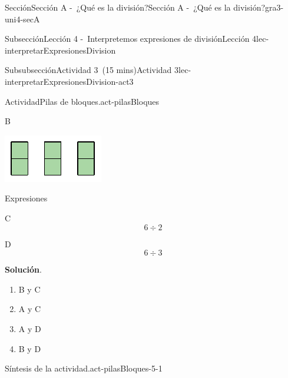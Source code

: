 \documentclass[oneside,10pt,]{article}
\newcommand{\blocktitlefont}{\relax}
\begin{document}
\begin{sectionptx}{Sección}{Sección A -~¿Qué es la división?}{}{Sección A -~¿Qué es la división?}{}{}{gra3-uni4-secA}
\begin{subsectionptx}{Subsección}{Lección 4 -~Interpretemos expresiones de división}{}{Lección 4}{}{}{lec-interpretarExpresionesDivision}
\begin{subsubsectionptx}{Subsubsección}{Actividad 3~(15 mins)}{}{Actividad 3}{}{}{lec-interpretarExpresionesDivision-act3}
\begin{activity}{Actividad}{Pilas de bloques.}{act-pilasBloques}
\begin{sidebyside}{2}{0.05}{0.05}{0.1}
\begin{sbspanel}{0.4}
\end{sbspanel}%
\begin{sbspanel}{0.4}%
B%
\par
\includegraphics[width=\linewidth]{external/svg-source/tikz-file-149317.pdf}
\end{sbspanel}%
\end{sidebyside}%
\par
Expresiones%
\begin{sidebyside}{2}{0.05}{0.05}{0.1}%
\begin{sbspanel}{0.4}%
C%
\begin{equation*}
6\div 2
\end{equation*}
%
\end{sbspanel}%
\begin{sbspanel}{0.4}%
\par
D%
\begin{equation*}
6\div 3
\end{equation*}
%
\end{sbspanel}%
\end{sidebyside}%
\par\smallskip%
\noindent\textbf{\blocktitlefont Solución}.\hypertarget{act-pilasBloques-3}{}\quad{}%
\begin{enumerate}
\item{}B y C%
\item{}A y C%
\item{}A y D%
\item{}B y D%
\end{enumerate}
%
\end{activity}%
\par
\begin{paragraphs}{Síntesis de la actividad.}{act-pilasBloques-5-1}%
%
\begin{itemize}[label=\textbullet]

\end{itemize}
\end{paragraphs}
\end{subsubsectionptx}
\end{subsectionptx}
\end{sectionptx}
\end{document}
